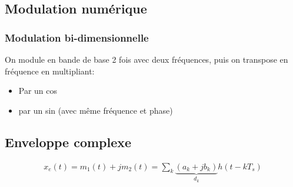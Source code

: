 \documentclass{article}
\begin{document}
\subsection{Modulation numérique}

\subsubsection{Modulation bi-dimensionnelle}

On module en bande de base 2 fois avec deux fréquences, puis on transpose en fréquence en multipliant:

\begin{itemize}
    \item Par un cos
    \item par un sin (avec même fréquence et phase)
\end{itemize}



\subsection{Enveloppe complexe}

\begin{align*}
    x_e(t) = m_1(t) + jm_2(t)  = \sum_{k} \underbrace{(a_k + jb_k)}_{d_k} h(t-kT_s) 
\end{align*}
\end{document}

